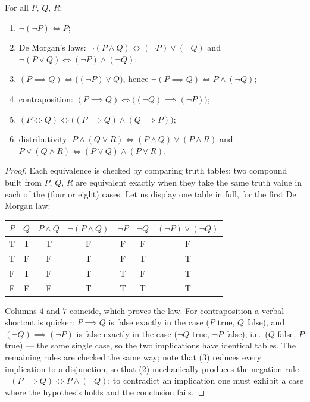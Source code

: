 \begin{proposition}\label{prop:b1:logic:rules}
For all  $P$, $Q$, $R$:
\begin{enumerate}
  \item $\lnot(\lnot P) \iff P$;
  \item De Morgan's laws:
        $\lnot(P \land Q) \iff (\lnot P) \lor (\lnot Q)$ and
        $\lnot(P \lor Q) \iff (\lnot P) \land (\lnot Q)$;
  \item $(P \implies Q) \iff \bigl((\lnot P) \lor Q\bigr)$, hence
        $\lnot(P \implies Q) \iff P \land (\lnot Q)$;
  \item contraposition:
        $(P \implies Q) \iff \bigl((\lnot Q) \implies (\lnot P)\bigr)$;
  \item $(P \iff Q) \iff \bigl((P \implies Q) \land (Q \implies
        P)\bigr)$;
  \item distributivity: $P \land (Q \lor R) \iff (P \land Q) \lor
        (P \land R)$ and $P \lor (Q \land R) \iff (P \lor Q) \land
        (P \lor R)$.
\end{enumerate}
\end{proposition}

\begin{proof}
Each equivalence is checked by comparing truth tables: two compound
 built from $P$, $Q$, $R$ are equivalent exactly when they
take the same truth value in each of the (four or eight) cases. Let us
display one table in full, for the first De Morgan law:
\begin{center}
\begin{tabular}{cc|c|c|cc|c}
$P$ & $Q$ & $P \land Q$ & $\lnot(P \land Q)$ & $\lnot P$ & $\lnot Q$ &
$(\lnot P) \lor (\lnot Q)$ \\
\hline
T & T & T & F & F & F & F \\
T & F & F & T & F & T & T \\
F & T & F & T & T & F & T \\
F & F & F & T & T & T & T \\
\end{tabular}
\end{center}
Columns $4$ and $7$ coincide, which proves the law. For contraposition
a verbal shortcut is quicker: $P \implies Q$ is false exactly in the
case ($P$ true, $Q$ false), and $(\lnot Q) \implies (\lnot P)$ is false
exactly in the case ($\lnot Q$ true, $\lnot P$ false), i.e.\ ($Q$
false, $P$ true) --- the same single case, so the two implications have
identical tables. The remaining rules are checked the same way; note
that (3) reduces every implication to a disjunction, so that (2)
mechanically produces the negation rule $\lnot(P \implies Q) \iff P
\land (\lnot Q)$: to contradict an implication one must exhibit a case
where the hypothesis holds and the conclusion fails.
\end{proof}

